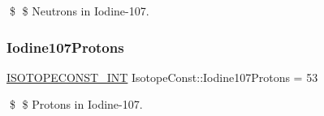 \$ \$ Neutrons in Iodine-\/107. \mbox{\label{group___isotope_const-_iodine-_i107_ga262b618b3d0b0fbc5be97ea2f5d1434f}} 
\subsubsection{\texorpdfstring{Iodine107\+Protons}{Iodine107Protons}}
{\footnotesize\ttfamily \mbox{\hyperlink{group___isotope_const-_macros_ga5f18360b3e99483a35c32d789e62621c}{I\+S\+O\+T\+O\+P\+E\+C\+O\+N\+S\+T\+\_\+\+I\+NT}} Isotope\+Const\+::\+Iodine107\+Protons = 53}

\$ \$ Protons in Iodine-\/107. 